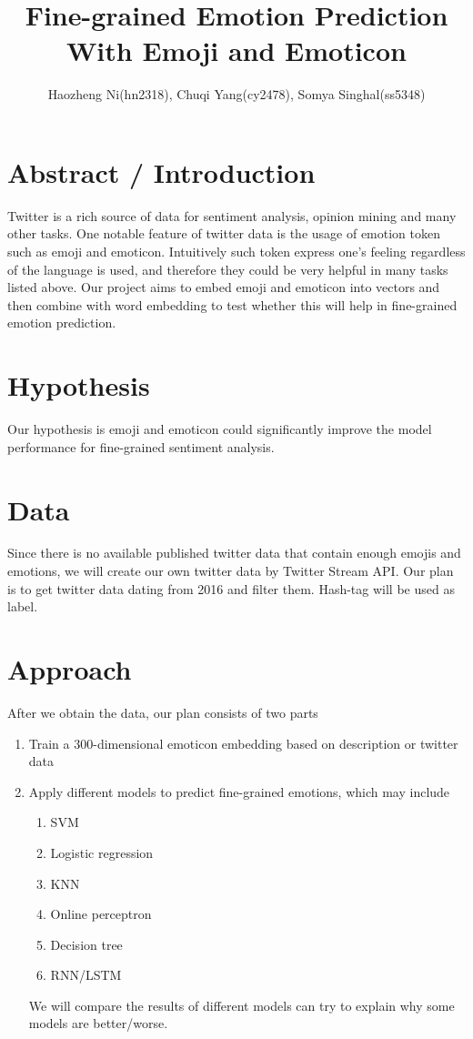 \documentclass{proc}
\begin{document}
\title{Fine-grained Emotion Prediction With Emoji and Emoticon}

\author{Haozheng Ni(hn2318), Chuqi Yang(cy2478), Somya Singhal(ss5348)}

\maketitle

\section{Abstract / Introduction}


Twitter is a rich source of data for sentiment analysis, opinion mining and many other tasks. One notable feature of twitter data is the usage of emotion token such as emoji and emoticon. Intuitively such token express one's feeling regardless of the language is used, and therefore they could be very helpful in many tasks listed above. Our project aims to embed emoji and emoticon into vectors and then combine with word embedding to test whether this will help in fine-grained emotion prediction.


\section{Hypothesis}
Our hypothesis is emoji and emoticon could significantly improve the model performance for fine-grained sentiment analysis. 


\section{Data}
Since there is no available published twitter data that contain enough emojis and emotions, we will create our own twitter data by Twitter Stream API. Our plan is to get twitter data dating from 2016 and filter them. Hash-tag will be used as label.

\section{Approach}
After we obtain the data, our plan consists of two parts
\begin{enumerate}
\item Train a 300-dimensional emoticon embedding based on description or twitter data
\item Apply different models to predict fine-grained emotions, which may include
\begin{enumerate}
  \item SVM
  \item Logistic regression
  \item KNN
  \item Online perceptron
  \item Decision tree
  \item RNN/LSTM 
  \end{enumerate}
  We will compare the results of different models can try to explain why some models are better/worse.
\end{enumerate}
\end{document}

